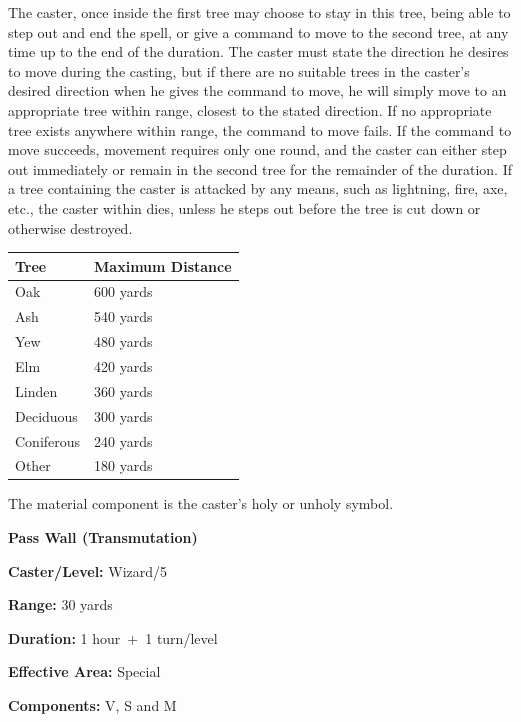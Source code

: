 \begin{multicols}{2}
The caster, once inside the first tree may choose to stay in this tree, being able to step out and end the spell, or give a command to move to the second tree, at any time up to the end of the duration.  The caster must state the direction he desires to move during the casting, but if there are no suitable trees in the caster's desired direction when he gives the command to move, he will simply move to an appropriate tree within range, closest to the stated direction.  If no appropriate tree exists anywhere within range, the command to move fails.  If the command to move succeeds, movement requires only one round, and the caster can either step out immediately or remain in the second tree for the remainder of the duration.  If a tree containing the caster is attacked by any means, such as lightning, fire, axe, etc., the caster within dies, unless he steps out before the tree is cut down or otherwise destroyed.

\noindent
\begin{tabular}{|p{}|p{}|}
\hline
Tree	& Maximum Distance\\
\hline\hline
\rowcolor[gray]{.9}Oak	& 600 yards \\
Ash	& 540 yards \\
\rowcolor[gray]{.9}Yew	& 480 yards \\
Elm	& 420 yards \\
\rowcolor[gray]{.9}Linden	& 360 yards \\
Deciduous	& 300 yards \\
\rowcolor[gray]{.9}Coniferous	& 240 yards \\
Other	& 180 yards \\
\hline
\end{tabular}

The material component is the caster's holy or unholy symbol.

\vspace{1em}

\noindent
\begin{minipage}{\columnwidth}

\noindent \textbf{Pass Wall (Transmutation)}

\noindent \textbf{Caster/Level:} Wizard/5

\noindent \textbf{Range:} 30 yards

\noindent \textbf{Duration:} 1 hour~+~1 turn/level

\noindent \textbf{Effective Area:} Special

\noindent \textbf{Components:} V, S and M


\end{minipage}
\end{multicols}
